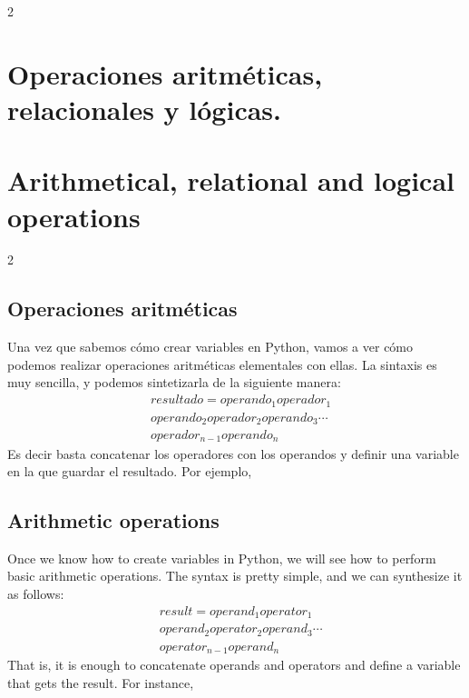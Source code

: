 \begin{paracol}{2}
\section[Operaciones aritméticas, relacionales y lógicas.]{Operaciones aritméticas, relacionales y lógicas.}
\switchcolumn
\section{Arithmetical, relational and logical operations}
\end{paracol}
\begin{paracol}{2}
\subsection{Operaciones aritméticas}
 Una vez que sabemos cómo crear variables en Python, vamos a ver cómo podemos realizar operaciones aritméticas elementales con ellas. La sintaxis es muy sencilla, y podemos sintetizarla de la siguiente manera:
\begin{equation*}
\begin{split}
&resultado=operando_1 operador_1\\
&operando_2 operador_2 operando_3 \cdots\\ 
&operador_{n-1} operando_n
\end{split}
\end{equation*}
Es decir basta concatenar los operadores con los operandos y definir una variable en la que guardar el resultado. Por ejemplo,
\switchcolumn
\subsection{Arithmetic operations}
Once we know how to create variables in Python, we will see how to perform basic arithmetic operations. The syntax is pretty simple, and we can synthesize it as follows:
\begin{equation*}
\begin{split}
&result=operand_1 operator_1\\
&operand_2 operator_2 operand_3 \cdots\\ 
&operator_{n-1} operand_n
\end{split}
\end{equation*}
That is, it is enough to concatenate operands and operators and define a variable that gets the result. For instance, 
\end{paracol}

